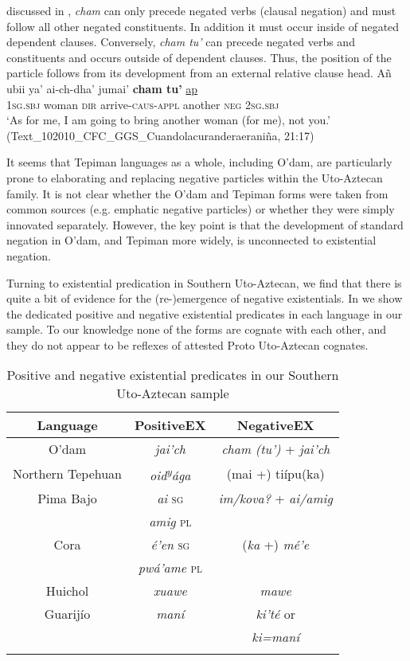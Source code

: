 \documentclass[output=paper]{langsci/langscibook}
\begin{document}
discussed in , \emph{cham} can only precede negated verbs (clausal negation) and must follow all other negated constituents. In addition it must occur inside of negated dependent clauses. Conversely, \emph{cham tu'} can precede negated verbs and constituents and occurs outside of dependent clauses. Thus, the position of the particle follows from its development from an external relative clause head.
\ea
\label{ex:odam-chamspec}
\gll Añ ubii ya’ ai-ch-dha’ jumai’ \textbf{cham tu’} \underline{ap}\\
\textsc{1sg.sbj} woman \textsc{dir} arrive-\textsc{caus-appl} another \textsc{neg} \textsc{2sg.sbj}\\
\glt ‘As for me, I am going to bring another woman (for me), not you.’
(Text\_102010\_CFC\_GGS\_Cuandolacuranderaeraniña, 21:17)
\z

It seems that Tepiman languages as a whole, including O'dam, are particularly prone to elaborating and replacing negative particles within the Uto-Aztecan family. It is not clear whether the O'dam and Tepiman forms were taken from common sources (e.g. emphatic negative particles) or whether they were simply innovated separately. However, the key point is that the development of standard negation in O'dam, and Tepiman more widely, is unconnected to existential negation.

Turning to existential predication in Southern Uto-Aztecan, we find that
there is quite a bit of evidence for the (re-)emergence of negative
existentials. In  we show the dedicated positive and negative existential predicates in each language in our sample. To our knowledge none of the forms are cognate with each other, and they do not appear to be reflexes of attested Proto Uto-Aztecan cognates.
\begin{table}
\caption{Positive and negative existential predicates in our Southern Uto-Aztecan sample}
\label{tab:odam-suaposnegex}
    \centering
    \begin{tabular}{ c c c }
    \lsptoprule
         Language & PositiveEX & NegativeEX \\
         \midrule
         O'dam & \emph{jai'ch} & \emph{cham (tu')} + \emph{jai'ch} \\
         \midrule
         Northern Tepehuan & \emph{oid\textsuperscript{y}ága} & (mai +) tiípu(ka)\\
         \midrule
         Pima Bajo & \emph{ai} \textsc{sg} & \emph{im/kova?} + \emph{ai/amig}\\
         & \emph{amig} \textsc{pl} & \\
         \midrule
         Cora & \emph{é'en} \textsc{sg} & (\emph{ka} +) \emph{mé'e}\\
         & \emph{pwá'ame} \textsc{pl} & \\
         \midrule 
         Huichol & \emph{xuawe} & \emph{mawe}\\
         \midrule
         Guarijío & \emph{maní} & \emph{ki'té} or\\
         & & \emph{ki=maní}\\
         \lspbottomrule
    \end{tabular}
\end{table}
\end{document}
